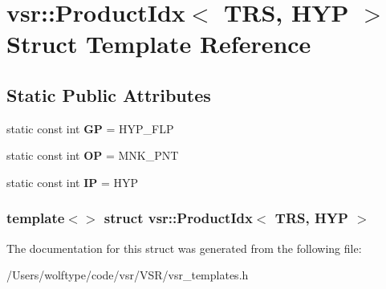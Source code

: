 \hypertarget{structvsr_1_1_product_idx_3_01_t_r_s_00_01_h_y_p_01_4}{\section{vsr\-:\-:Product\-Idx$<$ T\-R\-S, H\-Y\-P $>$ Struct Template Reference}
\label{structvsr_1_1_product_idx_3_01_t_r_s_00_01_h_y_p_01_4}
}
\subsection*{Static Public Attributes}
\begin{DoxyCompactItemize}
\item 
\hypertarget{structvsr_1_1_product_idx_3_01_t_r_s_00_01_h_y_p_01_4_ac8c8c0eba0568992fb5c072c3f05b738}{static const int {\bfseries G\-P} = H\-Y\-P\-\_\-\-F\-L\-P}\label{structvsr_1_1_product_idx_3_01_t_r_s_00_01_h_y_p_01_4_ac8c8c0eba0568992fb5c072c3f05b738}

\item 
\hypertarget{structvsr_1_1_product_idx_3_01_t_r_s_00_01_h_y_p_01_4_ae53354ce630a8dd0a3cad05e8f66d701}{static const int {\bfseries O\-P} = M\-N\-K\-\_\-\-P\-N\-T}\label{structvsr_1_1_product_idx_3_01_t_r_s_00_01_h_y_p_01_4_ae53354ce630a8dd0a3cad05e8f66d701}

\item 
\hypertarget{structvsr_1_1_product_idx_3_01_t_r_s_00_01_h_y_p_01_4_ab4a6536c9965aa5d19b0755eda6c3983}{static const int {\bfseries I\-P} = H\-Y\-P}\label{structvsr_1_1_product_idx_3_01_t_r_s_00_01_h_y_p_01_4_ab4a6536c9965aa5d19b0755eda6c3983}

\end{DoxyCompactItemize}
\subsubsection*{template$<$$>$ struct vsr\-::\-Product\-Idx$<$ T\-R\-S, H\-Y\-P $>$}



The documentation for this struct was generated from the following file\-:\begin{DoxyCompactItemize}
\item 
/\-Users/wolftype/code/vsr/\-V\-S\-R/vsr\-\_\-templates.\-h\end{DoxyCompactItemize}
